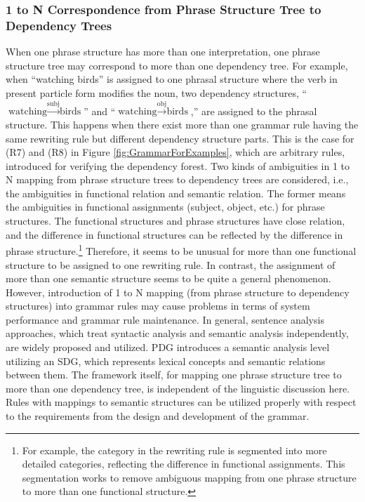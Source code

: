 \documentclass[english]{jnlp_1.4_rep}
\theoremstyle{break}
\theoremstyle{plain}
\theoremstyle{plain}
\begin{document}
\subsubsection{1 to N Correspondence from Phrase Structure Tree to Dependency Trees}

When one phrase structure has more than one interpretation, one phrase
structure tree may correspond to more than one dependency tree. For
example, when ``watching birds'' is assigned to one phrasal structure
where the verb in present particle form modifies the noun, two
dependency structures, ``$\text{watching} \xrightarrow{\mathrm{subj}} \text{birds}$'' 
and ``$\text{watching} \xrightarrow{\mathrm{obj}} \text{birds}$,'' are
assigned to the phrasal structure. This happens when there exist more
than one grammar rule having the same rewriting rule but different
dependency structure parts. This is the case for (R7) and (R8) in
Figure \ref{fig:GrammarForExamples}, which are arbitrary rules,
introduced for verifying the dependency forest. Two kinds of
ambiguities in 1 to N mapping from phrase structure trees to
dependency trees are considered, i.e., the ambiguities in functional
relation and semantic relation. The former means the ambiguities in
functional assignments (subject, object, etc.) for phrase
structures. The functional structures and phrase structures have close
relation, and the difference in functional structures can be reflected
by the difference in phrase structure.\footnote{For example, the
  category in the rewriting rule is segmented into more detailed
  categories, reflecting the difference in functional
  assignments. This segmentation works to remove ambiguous mapping
  from one phrase structure to more than one functional
  structure.} Therefore, it seems to be unusual for more than one
functional structure to be assigned to one rewriting rule. In
contrast, the assignment of more than one semantic structure seems to
be quite a general phenomenon. However, introduction of 1 to N mapping
(from phrase structure to dependency structures) into grammar rules
may cause problems in terms of system performance and grammar rule
maintenance. In general, sentence analysis approaches, which treat
syntactic analysis and semantic analysis independently, are widely
proposed and utilized. PDG introduces a semantic analysis level
utilizing an SDG, which represents lexical concepts and semantic
relations between them. The framework itself, for mapping one phrase
structure tree to more than one dependency tree, is independent of the
linguistic discussion here. Rules with mappings to semantic structures
can be utilized properly with respect to the requirements from the
design and development of the grammar.
\end{document}
